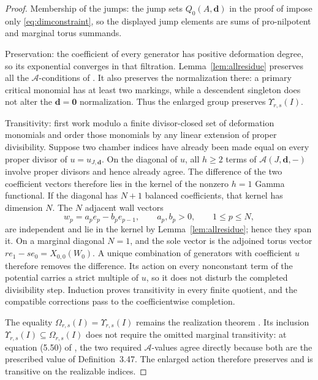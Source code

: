 \documentclass[11pt]{amsart}
\theoremstyle{definition}
\theoremstyle{remark}
\newcommand{\Ascr}{\mathcal{A}}
\newcommand{\Om}{\Omega_{r,s}}
\begin{document}
\begin{proof}
Membership of the jumps: the jump sets $Q_{0}(A,\mathbf d)$
in the proof of \cite[Thm.~5.9]{GKT} impose only \eqref{eq:dimconstraint}, so
the displayed jump elements are sums of pro-nilpotent and marginal torus
summands.

Preservation: the coefficient of every generator has positive deformation
degree, so its exponential converges in that filtration.  Lemma~\ref{lem:allresidue}
preserves all the $\Ascr$-conditions of \cite[Def.~3.47]{GKT}.  It also
preserves the normalization there: a primary critical monomial has at least
two markings, while a descendent singleton does not alter the
$\mathbf d=\mathbf0$ normalization.  Thus the enlarged group preserves
$\Upsilon_{r,s}(I)$.

Transitivity: first work modulo a finite divisor-closed set of deformation
monomials and order those monomials by any linear extension of proper
divisibility.  Suppose two chamber indices have already been made equal on
every proper divisor of $u=u_{J,\mathbf d}$.  On the diagonal of $u$, all
$h\ge2$ terms of $\Ascr(J,\mathbf d,-)$ involve proper divisors and hence
already agree.  The difference of the two coefficient vectors therefore lies
in the kernel of the nonzero $h=1$ Gamma functional.  If the diagonal has
$N+1$ balanced coefficients, that kernel has dimension $N$.  The $N$ adjacent
wall vectors
\[
 w_p=a_pe_p-b_pe_{p-1},\qquad a_p,b_p>0,\qquad 1\le p\le N,
\]
are independent and lie in the kernel by Lemma~\ref{lem:allresidue}; hence
they span it.  On a marginal diagonal $N=1$, and the sole vector is the
adjoined torus vector
$r e_1-s e_0=X_{0,0}(W_0)$.  A unique combination of generators with
coefficient $u$ therefore removes the difference.  Its action on every
nonconstant term of the potential carries a strict multiple of $u$, so it
does not disturb the completed divisibility step.  Induction proves
transitivity in every finite quotient, and the compatible corrections pass to
the coefficientwise completion.

The equality $\Om(I)=\Upsilon_{r,s}(I)$ remains the realization theorem
\cite[Thm.~5.13 and Cor.~5.14]{GKT}.  Its inclusion
$\Upsilon_{r,s}(I)\subseteq\Om(I)$ does not require the omitted marginal
transitivity: at equation (5.50) of \cite{GKT}, the two required
$\Ascr$-values agree directly because both are the prescribed value of
Definition~3.47.  The enlarged action therefore preserves and is transitive
on the realizable indices.


\end{proof}
\end{document}
